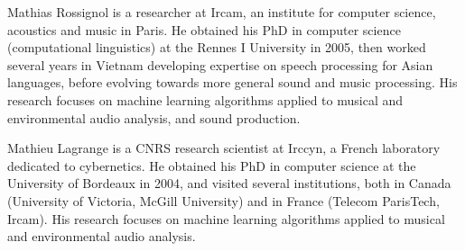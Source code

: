 \documentclass[10pt,journal,compsoc]{IEEEtran}
\begin{document}








%
%
%

\begin{IEEEbiography}{Mathias Rossignol} is a researcher at Ircam, an institute for computer science, acoustics and music in Paris. He obtained his PhD in computer science (computational linguistics) at the Rennes I University in 2005, then worked several years in Vietnam developing expertise on speech processing for Asian languages, before evolving towards more general sound and music processing. His research focuses on machine learning algorithms applied to musical and environmental audio analysis, and sound production.
\end{IEEEbiography}

\begin{IEEEbiography}{Mathieu Lagrange} is a CNRS research scientist at Irccyn, a French laboratory dedicated to cybernetics. He obtained his PhD in computer science at the University of Bordeaux in 2004, and visited several institutions, both in Canada (University of Victoria, McGill University) and in France (Telecom ParisTech, Ircam). His research focuses on machine learning algorithms applied to musical and environmental audio analysis.
\end{IEEEbiography}
\end{document}
